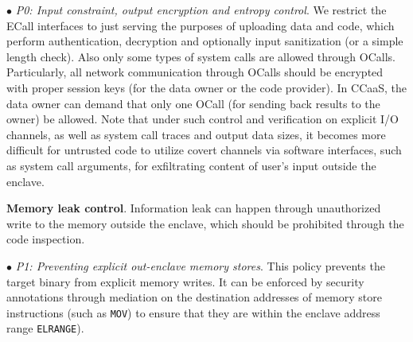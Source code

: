 \vspace{2pt}\noindent$\bullet$\textit{ P0: Input constraint, output encryption and entropy control}.
We restrict the ECall interfaces to just serving the purposes of uploading data and code, which perform authentication, decryption and optionally input sanitization (or a simple length check). Also only some types of system calls are allowed through OCalls. Particularly, all network communication through OCalls should be encrypted with proper session keys (for the data owner or the code provider). In CCaaS, the data owner can demand that only one OCall (for sending back results to the owner) be allowed. Note that under such control and verification on explicit I/O channels, as well as system call traces and output data sizes, it becomes more difficult for untrusted code to utilize covert channels via software interfaces, such as system call arguments, for exfiltrating content of user’s input outside the enclave.


\vspace{3pt}\noindent\textbf{Memory leak control}. Information leak can happen through unauthorized write to the memory outside the enclave, which should be prohibited through the code inspection. 


\vspace{2pt}\noindent$\bullet$\textit{ P1: Preventing explicit out-enclave memory stores}. This policy prevents the target binary from explicit memory writes. It can be enforced by security annotations through mediation on the destination addresses of memory store instructions (such as \texttt{MOV}) to ensure that they are within the enclave address range \texttt{ELRANGE}).

